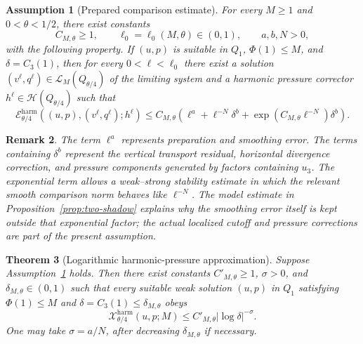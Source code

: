 \documentclass[pdflatex,sn-mathphys-num]{sn-jnl}
\numberwithin{equation}{section}
\theoremstyle{thmstyleone}
\newtheorem{theorem}{Theorem}[section]
\newtheorem{assumption}[theorem]{Assumption}
\theoremstyle{thmstylethree}
\newtheorem{remark}[theorem]{Remark}
\newcommand{\calH}{\mathcal H}
\newcommand{\calL}{\mathcal L}
\newcommand{\calE}{\mathcal E}
\newcommand{\calX}{\mathcal X}
\newcommand{\harm}{\mathrm{harm}}
\begin{document}
\begin{assumption}[Prepared comparison estimate]
\label{ass:prepared-comparison}
For every \(M\ge1\) and \(0<\theta<1/2\), there exist constants
\[
        C_{M,\theta}\ge1,
        \qquad
        \ell_0=\ell_0(M,\theta)\in(0,1),
        \qquad
        a,b,N>0,
\]
with the following property.  If \((u,p)\) is suitable in \(Q_1\), \(\Phi(1)\le M\), and \(\delta=C_3(1)\), then for every \(0<\ell<\ell_0\) there exist a solution \((v^\ell,q^\ell)\in\calL_M(Q_{\theta/4})\) of the limiting system and a harmonic pressure corrector \(h^\ell\in\calH(Q_{\theta/4})\) such that
\begin{equation}
\calE^{\harm}_{\theta/4}((u,p),(v^\ell,q^\ell);h^\ell)
\le C_{M,\theta}\left(\ell^a+\ell^{-N}\delta^b+\exp(C_{M,\theta}\ell^{-N})\delta^b\right).
\label{eq:prepared-comparison}
\end{equation}
\end{assumption}

\begin{remark}
The term \(\ell^a\) represents preparation and smoothing error.  The terms containing \(\delta^b\) represent the vertical transport residual, horizontal divergence correction, and pressure components generated by factors containing \(u_3\).  The exponential term allows a weak--strong stability estimate in which the relevant smooth comparison norm behaves like \(\ell^{-N}\).  The model estimate in Proposition~\ref{prop:two-shadow} explains why the smoothing error itself is kept outside that exponential factor; the actual localized cutoff and pressure corrections are part of the present assumption.
\end{remark}

\begin{theorem}[Logarithmic harmonic-pressure approximation]
\label{thm:log-approx-proof}
Suppose Assumption~\ref{ass:prepared-comparison} holds.  Then there exist constants \(C'_{M,\theta}\ge1\), \(\sigma>0\), and \(\delta_{M,\theta}\in(0,1)\) such that every suitable weak solution \((u,p)\) in \(Q_1\) satisfying \(\Phi(1)\le M\) and \(\delta=C_3(1)\le\delta_{M,\theta}\) obeys
\begin{equation}
        \calX^{\harm}_{\theta/4}(u,p;M)
        \le C'_{M,\theta}|\log\delta|^{-\sigma}.
        \label{eq:log-approx}
\end{equation}
One may take \(\sigma=a/N\), after decreasing \(\delta_{M,\theta}\) if necessary.
\end{theorem}
\end{document}
